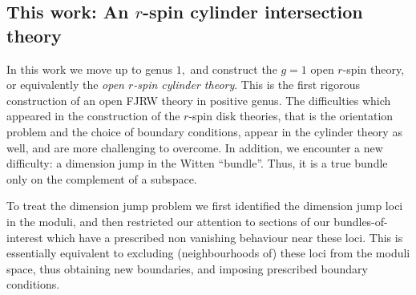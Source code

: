\documentclass[11pt]{amsart}
\theoremstyle{definition}
\theoremstyle{remark}
\newcommand{\<}{\left<}
\renewcommand{\>}{\right>}
\numberwithin{equation}{section}
\begin{document}
\subsection{This work: An $r$-spin cylinder intersection theory}
In this work we move up to genus $1,$ and construct the $g=1$ open $r$-spin %
theory, or equivalently the %
\emph{open $r$-spin cylinder theory}. This is the first rigorous construction of an open FJRW theory in positive genus.
The difficulties which appeared in the construction of the $r$-spin disk theories, %
that is the %
orientation problem and the choice of boundary conditions, appear in the cylinder theory as well, and are more challenging to overcome. In addition, we encounter a new %
difficulty: a dimension %
jump in the %
Witten ``bundle''. Thus, %
it is a true bundle only on the complement of a subspace.

To treat the dimension jump problem we first identified the dimension jump loci in %
the moduli, and then %
restricted our attention to sections of our bundles-of-interest which have a %
prescribed non vanishing behaviour %
near these loci.
This is essentially equivalent to %
excluding (neighbourhoods of) %
these loci from the moduli space, thus obtaining %
new boundaries, and %
imposing prescribed boundary conditions.
 
\end{document}
